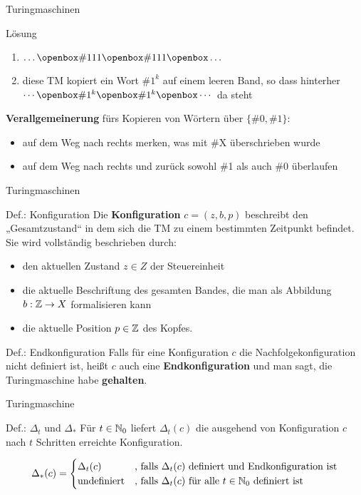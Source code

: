 \begin{frame}{Turingmaschinen}
    \begin{block}{Lösung}
    	\begin{enumerate}
    		\item $\dots \blank \#{111} \blank \#{111} \blank \dots$
    		\item diese TM kopiert ein Wort $\#1^k$ auf einem leeren Band, so dass hinterher $\cdots \blank \#1^k \blank \#1^k \blank \cdots$ da steht
    	\end{enumerate}
    \end{block}

    \textbf{Verallgemeinerung} fürs Kopieren von Wörtern über $\{\#0,\#1\}$:\\
    \begin{itemize}
    	\item auf dem Weg nach rechts merken, was mit \#X überschrieben wurde
    	\item auf dem Weg nach rechts und
    zurück sowohl \#1 als auch \#0 überlaufen
    \end{itemize}
\end{frame}

\begin{frame}{Turingmaschinen}
	\begin{block}{Def.: Konfiguration}
		Die \textbf{Konfiguration} $c = (z,b,p)$ beschreibt den „Gesamtzustand“ in dem sich die TM zu einem bestimmten Zeitpunkt befindet. Sie wird vollständig beschrieben durch:
			\begin{itemize}
			\item den aktuellen Zustand $z\in Z$ der Steuereinheit
			\item die aktuelle Beschriftung des gesamten Bandes, die man als
  			Abbildung $b:\mathbb{Z} \to X$ formalisieren kann
			\item die aktuelle Position $p\in \mathbb{Z}$ des Kopfes.
			\end{itemize}
	\end{block}

	\begin{block}{Def.: Endkonfiguration}
		Falls für eine Konfiguration $c$ die Nachfolgekonfiguration nicht definiert ist, heißt $c$ auch eine \textbf{Endkonfiguration} und man sagt, die Turingmaschine habe \textbf{gehalten}.
	\end{block}
\end{frame}

\begin{frame}{Turingmaschine}
    \begin{block}{Def.: $\Delta_t$ und $\Delta_*$}
    	Für $t\in \mathbb{N}_0$ liefert $\Delta_t(c)$ die ausgehend von Konfiguration $c$ nach $t$ Schritten erreichte Konfiguration.

    		\[
			\Delta_*(c) =
			\begin{cases}
  			\Delta_t(c) & \text{, falls $\Delta_t(c)$ definiert und Endkonfiguration ist} \\
  			\text{undefiniert} & \text{, falls $\Delta_t(c)$ für alle $t\in \mathbb{N}_0$ definiert ist} \\
			\end{cases}
			\]
    \end{block}
\end{frame}

